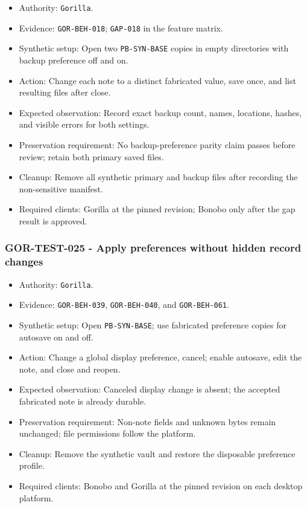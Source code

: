 \documentclass[
  letterpaper,
]{article}
\newcommand{\passthrough}[1]{#1}
\providecommand{\tightlist}{%
  \setlength{\itemsep}{0pt}\setlength{\parskip}{0pt}}
\begin{document}
\begin{itemize}
\tightlist
\item
  Authority: \passthrough{\lstinline!Gorilla!}.
\item
  Evidence: \nolinkurl{GOR-BEH-018}; \passthrough{\lstinline!GAP-018!} in the feature matrix.
\item
  Synthetic setup: Open two \nolinkurl{PB-SYN-BASE} copies in empty directories with backup preference off and on.
\item
  Action: Change each note to a distinct fabricated value, save once, and list resulting files after close.
\item
  Expected observation: Record exact backup count, names, locations, hashes, and visible errors for both settings.
\item
  Preservation requirement: No backup-preference parity claim passes before review; retain both primary saved files.
\item
  Cleanup: Remove all synthetic primary and backup files after recording the non-sensitive manifest.
\item
  Required clients: Gorilla at the pinned revision; Bonobo only after the gap result is approved.
\end{itemize}

\subsubsection{GOR-TEST-025 - Apply preferences without hidden record
changes}\label{gor-test-025---apply-preferences-without-hidden-record-changes}

\begin{itemize}
\tightlist
\item
  Authority: \passthrough{\lstinline!Gorilla!}.
\item
  Evidence: \nolinkurl{GOR-BEH-039}, \nolinkurl{GOR-BEH-040}, and \nolinkurl{GOR-BEH-061}.
\item
  Synthetic setup: Open \nolinkurl{PB-SYN-BASE}; use fabricated preference copies for autosave on and off.
\item
  Action: Change a global display preference, cancel; enable autosave, edit the note, and close and reopen.
\item
  Expected observation: Canceled display change is absent; the accepted fabricated note is already durable.
\item
  Preservation requirement: Non-note fields and unknown bytes remain unchanged; file permissions follow the platform.
\item
  Cleanup: Remove the synthetic vault and restore the disposable preference profile.
\item
  Required clients: Bonobo and Gorilla at the pinned revision on each desktop platform.
\end{itemize}
\end{document}
